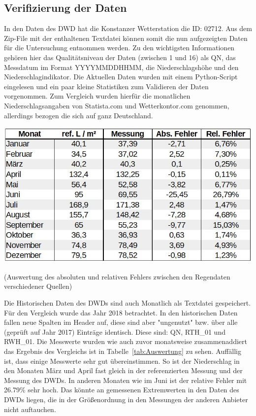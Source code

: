 \subsection{Verifizierung der Daten}
In den Daten des DWD hat die Konstanzer Wetterstation die ID: 02712. Aus dem Zip-File mit der enthaltenen Textdatei können somit die nun aufgezeigten Daten für die Untersuchung entnommen werden. Zu den wichtigsten Informationen gehören hier das Qualitätsniveau der Daten (zwischen 1 und 16) als QN, das Messdatum im Format YYYYMMDDHHMM, die Niederschlagshöhe und den Niederschlagindikator. Die Aktuellen Daten wurden mit einem Python-Script eingelesen und ein paar kleine Statistiken zum Validieren der Daten vorgenommen. Zum Vergleich wurden hierfür die monatlichen Niederschlagsangaben von Statista.com und Wetterkontor.com genommen, allerdings bezogen die sich auf ganz Deutschland. 
\begin{table}[ht]
\centering
\includegraphics[width=\linewidth]{pics/Auswertung_Thomas}
\caption{(Auswertung des absoluten und relativen Fehlers zwischen den Regendaten verschiedener Quellen)}
\label{tab:Auswertung}
\end{table}
Die Historischen Daten des DWDs sind auch Monatlich als Textdatei gespeichert. Für den Vergleich wurde das Jahr 2018 betrachtet. In den historischen Daten fallen neue Spalten im Header auf, diese sind aber "ungenutzt" bzw. über alle (geprüft auf Jahr 2017) Einträge identisch. Diese sind: QN, RTH\_01 und RWH\_01. Die Messwerte wurden wie auch zuvor monatsweise zusammenaddiert das Ergebnis des Vergleichs ist in Tabelle~\ref{tab:Auswertung} zu sehen. 
Auffällig ist, dass einige Messwerte sehr gut übereinstimmen. So ist der Niederschlag in den Monaten März und April fast gleich in der referenzierten Messung und der Messung des DWDs. In anderen Monaten wie im Juni ist der relative Fehler mit 26.79\% sehr hoch. Das könnte an gemessenen Extremwerten in den Daten des DWDs liegen, die in der Größenordnung in den Messungen der anderen Anbieter nicht auftauchen.  

